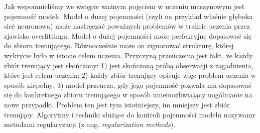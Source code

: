 \documentclass{myclass}
\numberwithin{equation}{subsection}
\begin{document}
Jak wspomnieliśmy we wstępie ważnym pojęciem w uczeniu maszynowym jest pojemność modeli. Model o
dużej pojemności (czyli na przykład właśnie głęboka sieć neuronowa) może nastręczać poważnych
problemów w trakcie uczenia przez zjawisko overfittingu. Model o dużej pojemności może perfekcyjne
dopasować się do zbioru trenującego. Równocześnie może on zignorować strukturę, której wykrycie było
w istocie celem uczenia. Przyczyną przeuczenia jest fakt, że każdy zbiór trenujący jest skończony:
1) jest skończoną próbą obserwacji z zagadnienia, które jest celem uczenia; 2) każdy zbiór trenujący
opisuje więc problem uczenia w sposób niepełny; 3) model przeucza, gdy jego pojemność pozwala mu
dopasować się do konkretnego zbioru trenującego w sposób uniemożliwiający uogólnianie na nowe
przypadki. Problem ten jest tym istotniejszy, im mniejszy jest zbiór trenujący. Algorytmy i techniki
służące do kontroli pojemności modelu nazywamy metodami regularyzacji (z ang. \textit{regularization
methods}).
\end{document}

